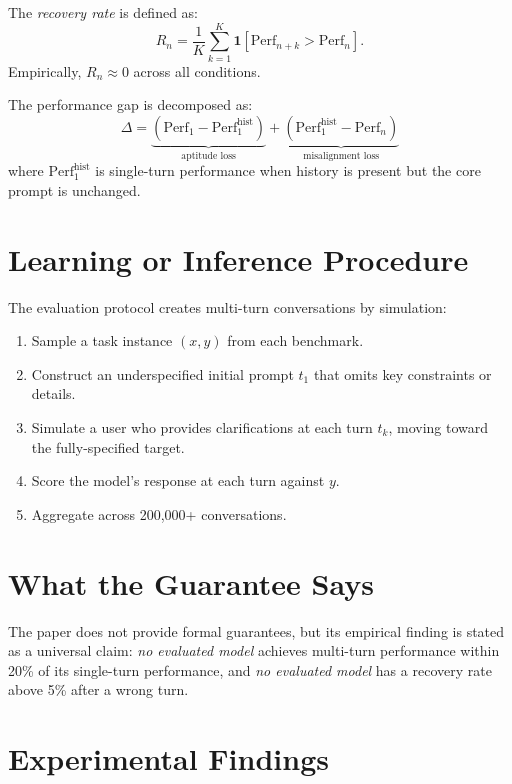 \documentclass[10pt,twocolumn]{article}
\begin{document}
The \emph{recovery rate} is defined as:
\[
R_n = \frac{1}{K}\sum_{k=1}^{K}
  \mathbf{1}\!\left[\text{Perf}_{n+k} > \text{Perf}_n\right].
\]
Empirically, $R_n \approx 0$ across all conditions.

The performance gap is decomposed as:
\[
\Delta = \underbrace{(\text{Perf}_1 - \text{Perf}_1^{\text{hist}})}_{\text{aptitude loss}}
       + \underbrace{(\text{Perf}_1^{\text{hist}} - \text{Perf}_n)}_{\text{misalignment loss}}
\]
where $\text{Perf}_1^{\text{hist}}$ is single-turn performance when history
is present but the core prompt is unchanged.

\section{Learning or Inference Procedure}

The evaluation protocol creates multi-turn conversations by simulation:
\begin{enumerate}[itemsep=2pt,parsep=0pt]
  \item Sample a task instance $(x, y)$ from each benchmark.
  \item Construct an underspecified initial prompt $t_1$ that omits key
    constraints or details.
  \item Simulate a user who provides clarifications at each turn $t_k$,
    moving toward the fully-specified target.
  \item Score the model's response at each turn against $y$.
  \item Aggregate across 200,000+ conversations.
\end{enumerate}

\section{What the Guarantee Says}

The paper does not provide formal guarantees, but its empirical finding
is stated as a universal claim: \emph{no evaluated model} achieves
multi-turn performance within 20\% of its single-turn performance,
and \emph{no evaluated model} has a recovery rate above 5\% after
a wrong turn.

\section{Experimental Findings}
\end{document}
